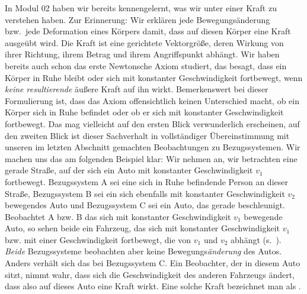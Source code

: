                \begin{MContent}
                          
               
               
               In Modul 02 haben wir bereits kennengelernt, was wir unter einer Kraft zu verstehen haben. Zur Erinnerung: Wir erkl\"aren jede Bewegungs\"anderung  bzw.~jede Deformation eines
               K\"orpers damit, dass auf diesen K\"orper eine Kraft ausge\"ubt wird. Die Kraft ist eine gerichtete Vektorgr\"o{\ss}e, deren Wirkung von ihrer Richtung, ihrem Betrag und ihrem
               Angriffspunkt abh\"angt. Wir haben bereits auch schon das erste Newtonsche Axiom studiert, das besagt, dass ein K\"orper in Ruhe bleibt oder sich mit konstanter Geschwindigkeit
               fortbewegt, wenn \textit{keine resultierende} \"au{\ss}ere Kraft auf ihn wirkt. Bemerkenswert bei dieser Formulierung ist, dass das  Axiom offensichtlich keinen Unterschied
               macht, ob ein K\"orper sich in Ruhe befindet oder ob er sich mit konstanter Geschwindigkeit fortbewegt. Das mag vielleicht auf den ersten Blick verwunderlich erscheinen, auf
               den zweiten Blick ist dieser Sachverhalt in vollst\"andiger \"Ubereinstimmung mit unseren im letzten Abschnitt gemachten Beobachtungen zu Bezugssystemen. Wir machen uns das am
               folgenden Beispiel klar: Wir nehmen an, wir betrachten eine gerade Stra{\ss}e, auf der sich ein Auto mit konstanter Geschwindigkeit $v_1$ fortbewegt. Bezugssystem A sei eine sich in Ruhe befindende Person an dieser Stra{\ss}e, Bezugssystem B sei ein sich ebenfalls mit konstanter Geschwindigkeit $v_2$ bewegendes Auto und Bezugssystem C sei ein Auto, das gerade
               beschleunigt. Beobachtet A bzw. B das sich mit konstanter Geschwindigkeit $v_1$ bewegende Auto, so sehen beide ein Fahrzeug, das sich mit konstanter Geschwindigkeit
               $v_1$ bzw. mit einer Geschwindigkeit fortbewegt, die von $v_1$ und $v_2$ abh\"angt (s.~).
               \textit{Beide} Bezugssysteme beobachten aber keine Bewegungs\textit{\"anderung} des Autos. \\
               Anders verh\"alt sich das bei Bezugssystem C. Ein Beobachter, der in diesem Auto sitzt, nimmt wahr, dass sich die Geschwindigkeit des anderen Fahrzeugs
               \"andert, dass also auf dieses Auto eine Kraft wirkt. Eine solche Kraft bezeichnet man als .
               

\end{MContent}
